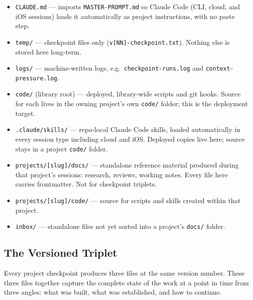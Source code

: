 \documentclass[12pt,letterpaper]{article}
\begin{document}
\begin{itemize}
  \item \texttt{CLAUDE.md} --- imports \texttt{MASTER-PROMPT.md} so
        Claude Code (CLI, cloud, and iOS sessions) loads it automatically
        as project instructions, with no paste step.
  \item \texttt{temp/} --- checkpoint files only
        (\texttt{v[NN]-checkpoint.txt}). Nothing else is stored here
        long-term.
  \item \texttt{logs/} --- machine-written logs, e.g.\
        \texttt{checkpoint-runs.log} and \texttt{context-pressure.log}.
  \item \texttt{code/} (library root) --- deployed, library-wide scripts
        and git hooks. Source for each lives in the owning project's
        own \texttt{code/} folder; this is the deployment target.
  \item \texttt{.claude/skills/} --- repo-local Claude Code skills,
        loaded automatically in every session type including cloud
        and iOS. Deployed copies live here; source stays in a project
        \texttt{code/} folder.
  \item \texttt{projects/[slug]/docs/} --- standalone reference material
        produced during that project's sessions: research, reviews,
        working notes. Every file here carries frontmatter. Not for
        checkpoint triplets.
  \item \texttt{projects/[slug]/code/} --- source for scripts and skills
        created within that project.
  \item \texttt{inbox/} --- standalone files not yet sorted into a
        project's \texttt{docs/} folder.
\end{itemize}

\subsection{The Versioned Triplet}

Every project checkpoint produces three files at the same version number.
These three files together capture the complete state of the work at a
point in time from three angles: what was built, what was established, and
how to continue.
\end{document}
